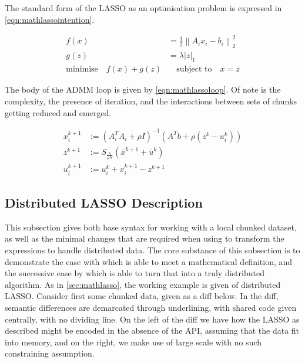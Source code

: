 The standard form of the LASSO as an optimisation problem is expressed in \cref{eqn:mathlassointention}.

\begin{equation}\label{eqn:mathlassointention}
    \begin{aligned}
        f(x) &= \frac{1}{2} \left\| A_i x_i - b_i \right\|^2_2 \\
        g(z) &= \lambda \left| z \right|_1 \\
        \text{minimise} \quad f(x) + g(z) &\quad \text{subject to} \quad x = z
    \end{aligned} 
\end{equation}

The body of the ADMM loop is given by \cref{eqn:mathlassoloop}.
Of note is the complexity, the presence of iteration, and the interactions between sets of chunks getting reduced and emerged.

\begin{equation}\label{eqn:mathlassoloop}
    \begin{aligned}
        x_i^{k+1} &:= (A_i^T A_i + \rho I)^{-1}(A^T b + \rho(z^k - u_i^k))\\
        z^{k+1} &:= S_\frac{\lambda}{\rho N} (\overline{x}^{k+1} + \overline{u}^k) \\
        u_i^{k+1} &:= u_i^k + x_i^{k+1} - z^{k+1}
    \end{aligned} 
\end{equation}

\subsection{Distributed LASSO \R Description}\label{sec:rlasso}

This subsection gives both base \R syntax for working with a local chunked dataset, as well as the minimal changes that are required when using  to transform the expressions to handle distributed data.
The core substance of this subsection is to demonstrate the ease with which  is able to meet a mathematical definition, and the successive ease by which  is able to turn that into a truly distributed algorithm.
As in \cref{sec:mathlasso}, the working example is given of distributed LASSO.
Consider first some chunked data, given as a diff below.
In the diff, semantic differences are demarcated through underlining, with shared code given centrally, with no dividing line.
On the left of the diff we have how the LASSO as described might be encoded in the absence of the API, assuming that the data fit into memory, and on the right, we make use of large scale \R with no such constraining assumption.

